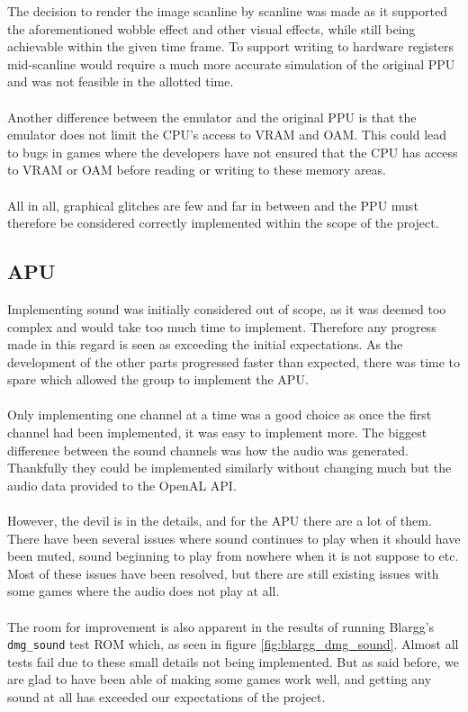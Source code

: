 The decision to render the image scanline by scanline was made as it supported the aforementioned wobble effect and other visual effects, while still being achievable within the given time frame. To support writing to hardware registers mid-scanline would require a much more accurate simulation of the original PPU and was not feasible in the allotted time.\\
\\
Another difference between the emulator and the original PPU is that the emulator does not limit the CPU's access to VRAM and OAM. This could lead to bugs in games where the developers have not ensured that the CPU has access to VRAM or OAM before reading or writing to these memory areas.\\
\\
All in all, graphical glitches are few and far in between and the PPU must therefore be considered correctly implemented within the scope of the project.

\subsection{APU}
Implementing sound was initially considered out of scope, as it was deemed too complex and would take too much time to implement. Therefore any progress made in this regard is seen as exceeding the initial expectations. As the development of the other parts progressed faster than expected, there was time to spare which allowed the group to implement the APU.
\\\\
Only implementing one channel at a time was a good choice as once the first channel had been implemented, it was easy to implement more. The biggest difference between  the sound channels was how the audio was generated. Thankfully they could be implemented similarly without changing much but the audio data provided to the OpenAL API.
\\\\
However, the devil is in the details, and for the APU there are a lot of them. There have been several issues where sound continues to play when it should have been muted, sound beginning to play from nowhere when it is not suppose to etc. Most of these issues have been resolved, but there are still existing issues with some games where the audio does not play at all.
\\\\
The room for improvement is also apparent in the results of running Blargg's \texttt{dmg\_sound} \cite{Blargg} test ROM which, as seen in figure \ref{fig:blargg_dmg_sound}. Almost all tests fail due to these small details not being implemented. But as said before, we are glad to have been able of making some games work well, and getting any sound at all has exceeded our expectations of the project.

